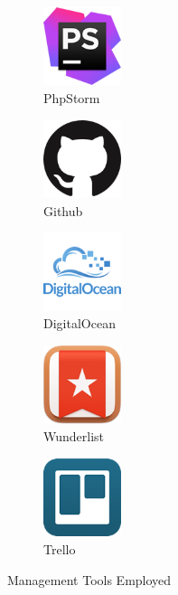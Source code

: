 \begin{figure}[H]
	\centering
	\begin{subfigure}[t]{0.9in}
		\centering
		\includegraphics[width=0.9in]{images/icons/PHPStorm}
		\caption{PhpStorm}\label{fig:PHPStorm}		
	\end{subfigure}
	\quad
	\begin{subfigure}[t]{0.9in}
		\centering
		\includegraphics[width=0.9in]{images/icons/Github}
		\caption{Github}\label{fig:Github}
	\end{subfigure}
    \quad
	\begin{subfigure}[t]{0.9in}
		\centering
		\includegraphics[width=0.9in]{images/icons/DigitalOcean}
		\caption{DigitalOcean}\label{fig:DigitalOcean}
	\end{subfigure}
    \quad
	\begin{subfigure}[t]{0.9in}
		\centering
		\includegraphics[width=0.9in]{images/icons/Wunderlist}
		\caption{Wunderlist}\label{fig:Wunderlist}
	\end{subfigure}
    \quad
	\begin{subfigure}[t]{0.9in}
		\centering
		\includegraphics[width=0.9in]{images/icons/Trello}
		\caption{Trello}\label{fig:Trello}
	\end{subfigure}
	\caption{Management Tools Employed}\label{fig:ManagementTools}
\end{figure}

